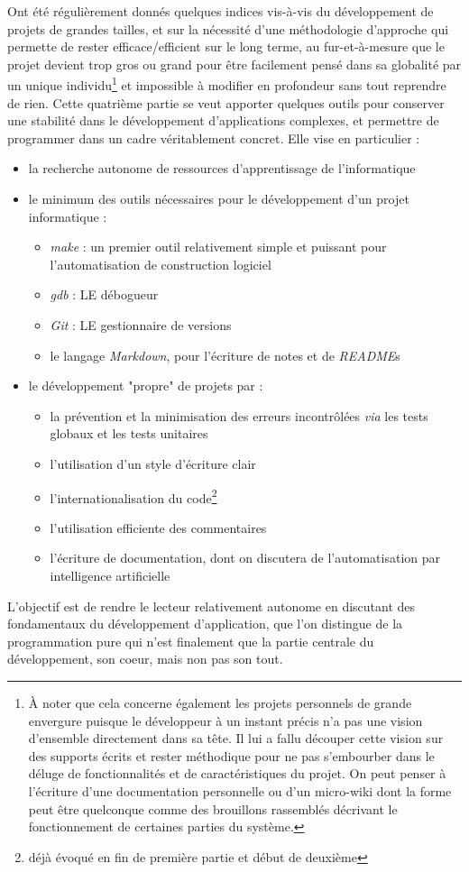 \documentclass[../../main.tex]{subfiles}
\begin{document}
Ont été régulièrement donnés quelques indices vis-à-vis du développement de projets de grandes tailles, et sur la nécessité d'une méthodologie d'approche qui permette de rester efficace/efficient sur le long terme, au fur-et-à-mesure que le projet devient trop gros ou grand pour être facilement pensé dans sa globalité par un unique individu\footnote{À noter que cela concerne également les projets personnels de grande envergure puisque le développeur à un instant précis n'a pas une vision d'ensemble directement dans sa tête. Il lui a fallu découper cette vision sur des supports écrits et rester méthodique pour ne pas s'embourber dans le déluge de fonctionnalités et de caractéristiques du projet. On peut penser à l'écriture d'une documentation personnelle ou d'un micro-wiki dont la forme peut être quelconque comme des brouillons rassemblés décrivant le fonctionnement de certaines parties du système.} et impossible à modifier en profondeur sans tout reprendre de rien. Cette quatrième partie se veut apporter quelques outils pour conserver une stabilité dans le développement d'applications complexes, et permettre de programmer dans un cadre véritablement concret. Elle vise en particulier :
\begin{itemize}
	\item la recherche autonome de ressources d'apprentissage de l'informatique
	\item le minimum des outils nécessaires pour le développement d'un projet informatique :
		\begin{itemize}
			\item \textit{make} : un premier outil relativement simple et puissant pour l'automatisation de construction logiciel
			\item \textit{gdb} : LE débogueur
			\item \textit{Git} : LE gestionnaire de versions
			\item le langage \textit{Markdown}, pour l'écriture de notes et de \textit{README}s
		\end{itemize}
	\item le développement "propre" de projets par :
	\begin{itemize}
		\item la prévention et la minimisation des erreurs incontrôlées \textit{via} les tests globaux et les tests unitaires
		\item l'utilisation d'un style d'écriture clair
		\item l'internationalisation du code\footnote{déjà évoqué en fin de première partie et début de deuxième}
		\item l'utilisation efficiente des commentaires
		\item l'écriture de documentation, dont on discutera de l'automatisation par intelligence artificielle
	\end{itemize}
\end{itemize}
L'objectif est de rendre le lecteur relativement autonome en discutant des fondamentaux du développement d'application, que l'on distingue de la programmation pure qui n'est finalement que la partie centrale du développement, son coeur, mais non pas son tout.

\hrulefill
\newpage
\end{document}
